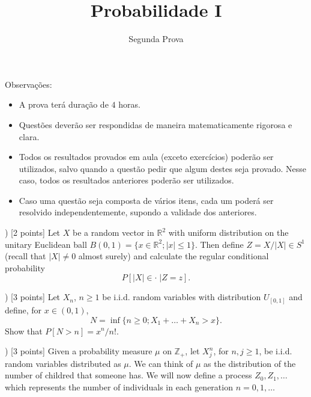 \documentclass{article}
\newcommand*\1{\mathds{1}}
\begin{document}
\title{Probabilidade I}
\author{Segunda Prova}

\maketitle

\noindent Observa\c{c}\~oes:
\begin{itemize}
\item A prova terá duração de $4$ horas.
\item Questões deverão ser respondidas de maneira matematicamente rigorosa e clara.
\item Todos os resultados provados em aula (exceto exercícios) poderão ser utilizados, salvo quando a questão pedir que algum destes seja provado. Nesse caso, todos os resultados anteriores poderão ser utilizados.
\item Caso uma questão seja composta de vários itens, cada um poderá ser resolvido independentemente, supondo a validade dos anteriores.
\end{itemize}

\vspace{4mm}
) [2 points] Let $X$ be a random vector in $\mathbb{R}^2$ with uniform distribution on the unitary Euclidean ball $B(0,1) = \{x \in \mathbb{R}^2; |x| \leq 1\}$.
Then define $Z = X/|X| \in S^1$ (recall that $|X| \neq 0$ almost surely) and calculate the regular conditional probability
\begin{equation}
  P[|X| \in \cdot \; | Z = z].
\end{equation}
\vspace{4mm}

\vspace{4mm}
) [3 points] Let $X_n$, $n \geq 1$ be i.i.d. random variables with distribution $U_{[0,1]}$ and define, for $x \in (0,1)$,
\begin{equation}
  N = \inf\{n \geq 0; X_1 + \dots + X_n > x\}.
\end{equation}
Show that $P[N > n] = x^n/n!$.
\vspace{4mm}

) [3 points] Given a probability measure $\mu$ on $\mathbb{Z}_+$, let $X^n_j$, for $n, j \geq 1$, be i.i.d. random variables distributed as $\mu$.
We can think of $\mu$ as the distribution of the number of childred that someone has.
We will now define a process $Z_0, Z_1, \dots$ which represents the number of individuals in each generation $n = 0, 1, \dots$
\end{document}
